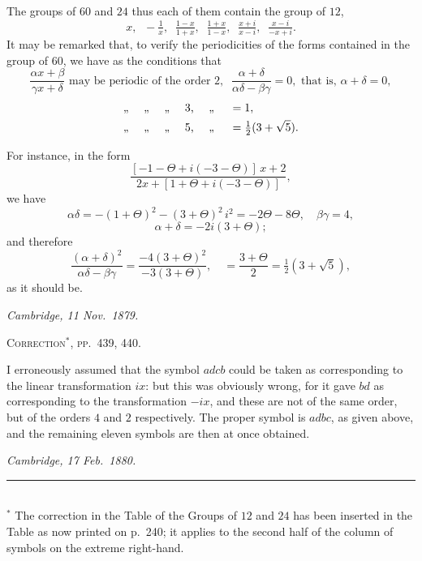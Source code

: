 \documentclass[11pt,a4paper]{article}
\begin{document}
\noindent The groups of $60$ and $24$ thus each of them contain the group of
$12$,
\[
  x,\;\; -\tfrac{1}{x},\;\; \tfrac{1 - x}{1 + x},\;\; \tfrac{1 + x}{1 - x},\;\;
  \tfrac{x + i}{x - i},\;\; \tfrac{x - i}{-x + i}.
\]
It may be remarked that, to verify the periodicities of the forms contained
in the group of $60$, we have as the conditions that
\[
  \frac{\alpha x + \beta}{\gamma x + \delta} \text{ may be periodic of the
  order } 2,\;\; \frac{\alpha + \delta}{\alpha\delta - \beta\gamma} = 0,
  \text{ that is, } \alpha + \delta = 0,
\]
\begin{align*}
  & \text{,, \quad ,, \quad ,, \quad 3, \quad ,, } \quad = 1, \\
  & \text{,, \quad ,, \quad ,, \quad 5, \quad ,, } \quad
    = \tfrac{1}{2}(3 + \sqrt{5}).
\end{align*}

For instance, in the form
\[
  \frac{[-1 - \Theta + i(-3 - \Theta)]\,x + 2}{2x + [1 + \Theta + i(-3 - \Theta)]},
\]
we have
\[
  \alpha\delta = -(1 + \Theta)^{2} - (3 + \Theta)^{2}\,i^{2} = -2\Theta - 8\Theta,
  \quad \beta\gamma = 4,
\]
\[
  \alpha + \delta = -2i(3 + \Theta);
\]
and therefore
\[
  \frac{(\alpha + \delta)^{2}}{\alpha\delta - \beta\gamma}
   = \frac{-4(3 + \Theta)^{2}}{-3(3 + \Theta)},
   \quad = \frac{3 + \Theta}{2}
   = \tfrac{1}{2}(3 + \sqrt{5}),
\]
as it should be.

\medskip

\noindent\textit{Cambridge, 11 Nov.\ 1879.}

\bigskip

\begin{center}
\textsc{Correction$^{*}$, pp.\ 439, 440.}
\end{center}

\medskip

\noindent
I erroneously assumed that the symbol $adcb$ could be taken as corresponding
to the linear transformation $ix$: but this was obviously wrong, for it gave
$bd$ as corresponding to the transformation $-ix$, and these are not of the
same order, but of the orders $4$ and $2$ respectively.  The proper symbol
is $adbc$, as given above, and the remaining eleven symbols are then at
once obtained.

\medskip

\noindent\textit{Cambridge, 17 Feb.\ 1880.}

\vspace{1em}
\noindent\rule{0.25\textwidth}{0.4pt}\\
{\footnotesize $^{*}$ The correction in the Table of the Groups of $12$ and
$24$ has been inserted in the Table as now printed on p.\ 240; it applies to
the second half of the column of symbols on the extreme right-hand.}
\end{document}
